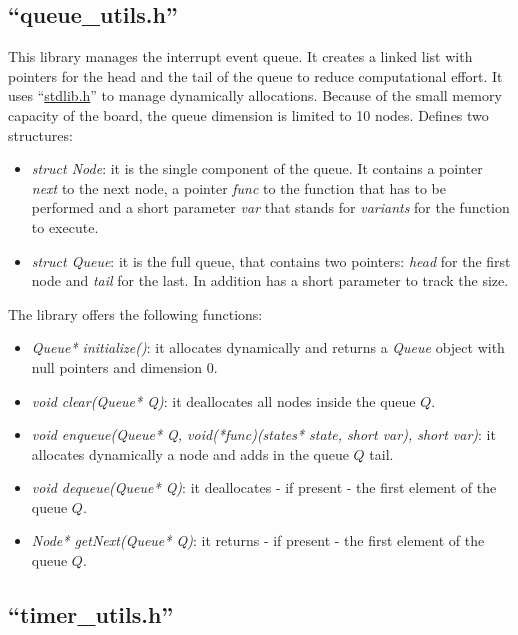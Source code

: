 \documentclass[a4paper,12pt]{report}
\begin{document}
    \subsection{``queue\_utils.h''}

    This library manages the interrupt event queue. It creates a linked list with pointers for the head and the tail of the queue to reduce computational effort. It uses ``\href{https://www.ibm.com/docs/en/zos/2.4.0?topic=files-stdlibh-standard-library-functions}{stdlib.h}'' to manage dynamically allocations. 
    Because of the small memory capacity of the board, the queue dimension is limited to 10 nodes. 
    \newline
    \newline
    Defines two structures:
    \begin{itemize}
        \item \textit{struct Node}: it is the single component of the queue. It contains a pointer \textit{next} to the next node, a pointer \textit{func} to the function that has to be performed and a short parameter \textit{var} that stands for \textit{variants} for the function to execute. 
        \item \textit{struct Queue}: it is the full queue, that contains two pointers: \textit{head} for the first node and \textit{tail} for the last. In addition has a short parameter to track the size. 
    \end{itemize}
    The library offers the following functions:
    \begin{itemize}
        \item \textit{Queue* initialize()}: it allocates dynamically and returns a \textit{Queue} object with null pointers and dimension 0. 
        \item \textit{void clear(Queue* Q)}: it deallocates all nodes inside the queue $Q$. 
        \item \textit{void enqueue(Queue* Q, void(*func)(states* state, short var), short var)}: it allocates dynamically a node and adds in the queue $Q$ tail. 
        \item \textit{void dequeue(Queue* Q)}: it deallocates - if present - the first element of the queue $Q$. 
        \item \textit{Node* getNext(Queue* Q)}: it returns - if present - the first element of the queue $Q$. 
    \end{itemize}
    
    \subsection{``timer\_utils.h''}
\end{document}
